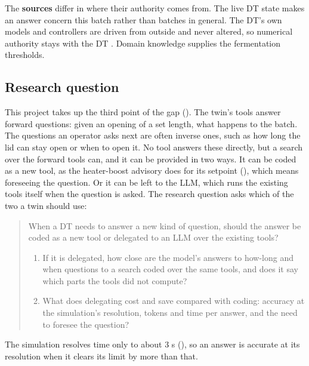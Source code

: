   The \textbf{sources} differ in where their authority comes from. The live DT state makes an
  answer concern this batch rather than batches in general. The DT's own models and controllers
  are driven from outside and never altered, so numerical authority stays with the DT
  \cite{gomes2025incubator}. Domain knowledge supplies the fermentation thresholds.

  \subsection{Research question}
  \label{sec:rq}

  This project takes up the third point of the gap (). The twin's tools answer
  forward questions: given an opening of a set length, what happens to the batch. The questions an
  operator asks next are often inverse ones, such as how long the lid can stay open or when to open
  it. No tool answers these directly, but a search over the forward tools can, and it can be
  provided in two ways. It can be coded as a new tool, as the heater-boost advisory does for its
  setpoint (), which means foreseeing the question. Or it can be left to the
  LLM, which runs the existing tools itself when the question is asked. The research
  question asks which of the two a twin should use:

  \begin{quote}
    When a DT needs to answer a new kind of question, should the answer be coded as a
    new tool or delegated to an LLM over the existing tools?
    \begin{enumerate}[label=(\alph*)]
      \item If it is delegated, how close are the model's answers to how-long and when questions
        to a search coded over the same tools, and does it say which parts the tools did not
        compute?
      \item What does delegating cost and save compared with coding: accuracy at the simulation's
        resolution, tokens and time per answer, and the need to foresee the question?
    \end{enumerate}
  \end{quote}

  The simulation resolves time only to about 3 s (), so an answer is accurate
  at its resolution when it clears its limit by more than that.
